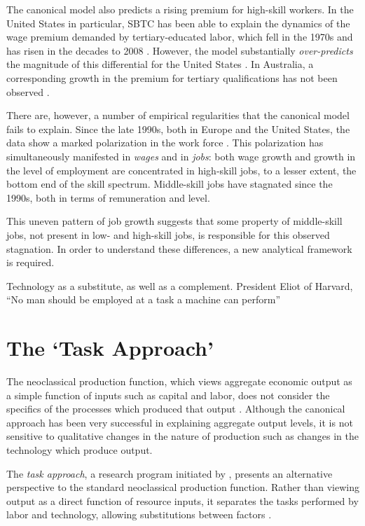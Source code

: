 \documentclass[a4paper,11pt]{article}
\begin{document}
The canonical model also predicts a rising premium for high-skill workers. In the United States in particular, SBTC has been able to explain the dynamics of the wage premium demanded by tertiary-educated labor, which fell in the 1970s and has risen in the decades to 2008 \citep{Acemoglu2011}. However, the model substantially \emph{over-predicts} the magnitude of this differential for the United States \citep{Autor2008}. In Australia, a corresponding growth in the premium for tertiary qualifications has not been observed \citep{Coelli2009}.

There are, however, a number of empirical regularities that the canonical model fails to explain. Since the late 1990s, both in Europe and the United States, the data show a marked polarization in the work force \citep{Goos2007, Autor2006}. This polarization has simultaneously manifested in \emph{wages} and in \emph{jobs}: both wage growth and growth in the level of employment are concentrated in high-skill jobs, to a lesser extent, the bottom end of the skill spectrum. Middle-skill jobs have stagnated since the 1990s, both in terms of remuneration and level.

This uneven pattern of job growth suggests that some property of middle-skill jobs, not present in low- and high-skill jobs, is responsible for this observed stagnation. In order to understand these differences, a new analytical framework is required.

Technology as a substitute, as well as a complement. President Eliot of Harvard, ``No man should be employed at a task a machine can perform'' \cite{Nordhaus2007}


\section{The `Task Approach'}

The neoclassical production function, which views aggregate economic output as a simple function of inputs such as capital and labor, does not consider the specifics of the processes which produced that output \citep{Acemoglu2011}. Although the canonical approach has been very successful in explaining aggregate output levels, it is not sensitive to qualitative changes in the nature of production such as changes in the technology which produce output. 


The {\em task approach}, a research program initiated by \citet{Levy2003}, presents an alternative perspective to the standard neoclassical production function. Rather than viewing output as a direct function of resource inputs, it separates the tasks performed by labor and technology, allowing  substitutions between factors \citep{Autor2013,Acemoglu2011}. 
\end{document}
